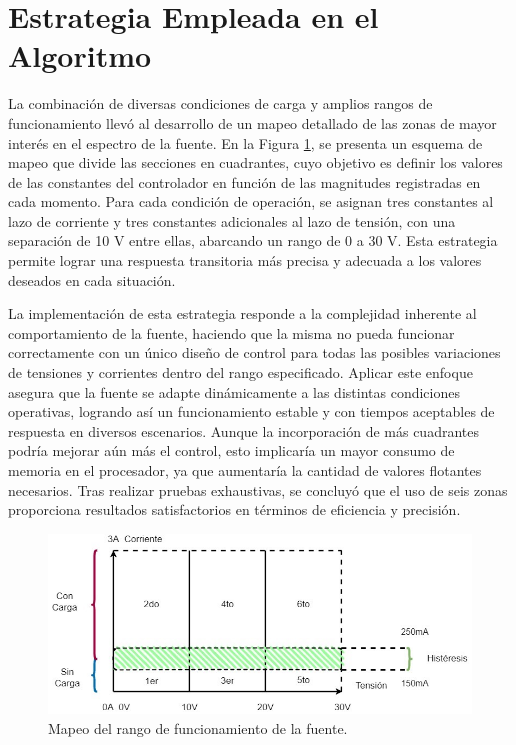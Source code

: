\section{Estrategia Empleada en el Algoritmo}
La combinación de diversas condiciones de carga y amplios rangos de funcionamiento llevó al desarrollo de un mapeo detallado de las zonas de mayor interés en el espectro de la fuente. En la Figura \ref{F:mapeo_cuadrantes}, se presenta un esquema de mapeo que divide las secciones en cuadrantes, cuyo objetivo es definir los valores de las constantes del controlador en función de las magnitudes registradas en cada momento. Para cada condición de operación, se asignan tres constantes al lazo de corriente y tres constantes adicionales al lazo de tensión, con una separación de 10 V entre ellas, abarcando un rango de 0 a 30 V. Esta estrategia permite lograr una respuesta transitoria más precisa y adecuada a los valores deseados en cada situación. \par

La implementación de esta estrategia responde a la complejidad inherente al comportamiento de la fuente, haciendo que la misma no pueda funcionar correctamente con un único diseño de control para todas las posibles variaciones de tensiones y corrientes dentro del rango especificado. Aplicar este enfoque asegura que la fuente se adapte dinámicamente a las distintas condiciones operativas, logrando así un funcionamiento estable y con tiempos aceptables de respuesta en diversos escenarios. Aunque la incorporación de más cuadrantes podría mejorar aún más el control, esto implicaría un mayor consumo de memoria en el procesador, ya que aumentaría la cantidad de valores flotantes necesarios. Tras realizar pruebas exhaustivas, se concluyó que el uso de seis zonas proporciona resultados satisfactorios en términos de eficiencia y precisión.\par


\begin{figure}[H]
    \centering
    \includegraphics[width=1\textwidth]{./imagenes/matriz.jpg}
    \caption{Mapeo del rango de funcionamiento de la fuente.}
    \label{F:mapeo_cuadrantes}
\end{figure}\par

